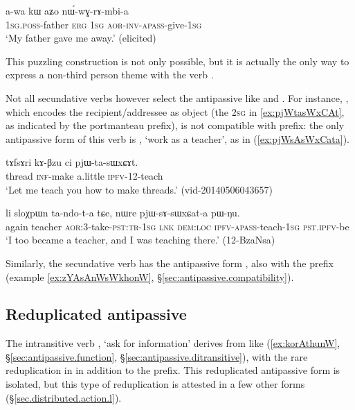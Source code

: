  \begin{exe}
\ex \label{ex:nWwGrAmbia2}
\gll  a-wa kɯ aʑo nɯ́-wɣ-rɤ-mbi-a \\
\textsc{1sg}.\textsc{poss}-father \textsc{erg} \textsc{1sg} \textsc{aor}-\textsc{inv}-\textsc{apass}-give-\textsc{1sg} \\
\glt `My father gave me away.' (elicited)
\end{exe}

This puzzling construction is not only possible, but it is actually the only way to express a non-third person theme with the verb .
 
Not all secundative verbs however select the  antipassive like  and  . For instance, , which encodes the recipient/addressee as object (the \textsc{2sg} in \ref{ex:pjWtasWxCAt}, as indicated by the  portmanteau prefix), is not compatible with  prefix: the only antipassive form of this verb is , `work as a teacher', as in (\ref{ex:pjWsAsWxCata}).

\begin{exe}
\ex \label{ex:pjWtasWxCAt}
\gll tɤfsɤri kɤ-βzu ci pjɯ-ta-sɯxɕɤt. \\
thread \textsc{inf}-make a.little \textsc{ipfv}-1\fl{}2-teach \\
\glt `Let me teach you how to make threads.' (vid-20140506043657)
\end{exe}

\begin{exe}
\ex \label{ex:pjWsAsWxCata}
\gll li sloχpɯn ta-ndo-t-a tɕe, nɯre pjɯ-sɤ-sɯxɕat-a pɯ-ŋu. \\
again teacher \textsc{aor}:3\flobv{}-take-\textsc{pst}:\textsc{tr}-\textsc{1sg} \textsc{lnk} \textsc{dem}:\textsc{loc} \textsc{ipfv}-\textsc{apass}-teach-\textsc{1sg} \textsc{pst}.\textsc{ipfv}-be \\
\glt `I too became a teacher, and I was teaching there.' (12-BzaNsa) 
\end{exe} 

Similarly, the secundative verb  has the antipassive form , also with the  prefix (example \ref{ex:zYAsAnWsWkhonW}, §\ref{sec:antipassive.compatibility}).

 \subsection{Reduplicated antipassive} \label{sec:antipassive.redp}
The intransitive verb , `ask for information' derives from  like  (\ref{ex:korAthunW}, §\ref{sec:antipassive.function}, §\ref{sec:antipassive.ditransitive}), with the rare reduplication in  in addition to the  prefix. This reduplicated antipassive form is isolated, but this type of reduplication is attested in a few other forms (§\ref{sec.distributed.action.l}).

